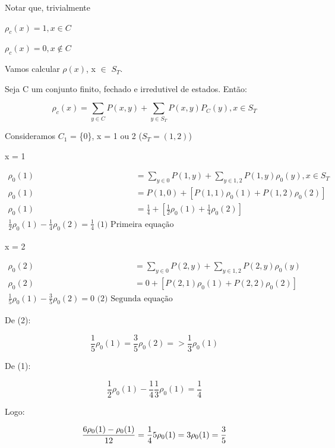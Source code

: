 \documentclass[]{article}
\theoremstyle{definition}
\theoremstyle{definition}
\theoremstyle{definition}
\theoremstyle{remark}
\let\BeginKnitrBlock\begin \let\EndKnitrBlock\end
\begin{document}
Notar que, trivialmente

\(\rho_c(x) = 1, x \in C\)

\(\rho_c(x) =0, x \notin C\)

Vamos calcular \(\rho(x)\), x \(\in\) \(S_T\).

\BeginKnitrBlock{theorem}
\protect\hypertarget{thm:unnamed-chunk-45}{}{\label{thm:unnamed-chunk-45}
}Seja C um conjunto finito, fechado e irredutivel de estados. Então:

\[\rho_c(x) = \sum_{y \in C}P(x,y) + \sum_{y \in S_T} P(x,y)P_C(y), x
\in S_T\]
\EndKnitrBlock{theorem}

Consideramos \(C_1\) = \{0\}, x = 1 ou 2 (\(S_T = (1,2)\))

x = 1

\begin{equation}
\begin{split}
\rho_{{0}}(1) &= \sum_{y \in {0}}P(1,y) + \sum_{y \in
{1,2}}P(1,y)\rho_{{0}}(y), x \in S_T\\
\rho_{{0}}(1) &= P(1,0) + [P(1,1) \rho_{{0}}(1) + P(1,2) \rho_{{0}}(2)]\\
\rho_{{0}}(1) &= \frac{1}{4} + [\frac{1}{2} \rho_{{0}}(1) + \frac{1}{4}
\rho_{{0}}(2)]\\
\frac{1}{2} \rho_{{0}}(1) - \frac{1}{4}\rho_{{0}}(2) = \frac{1}{4} \text{ (1)
Primeira equação}
\end{split}
\end{equation}

x = 2

\begin{equation}
\begin{split}
\rho_{{0}}(2) &= \sum_{y \in {0}} P(2,y) + \sum_{y \in
{1,2}}P(2,y)\rho_{{0}}(y)\\
\rho_{{0}}(2) &= 0 + [P(2,1)\rho_{{0}}(1) + P(2,2)\rho_{{0}}(2)]\\
\frac{1}{5}\rho_{{0}}(1) - \frac{3}{5} \rho_{{0}}(2) = 0 \text{ (2)
Segunda equação}
\end{split}
\end{equation}

De (2):

\[\frac{1}{5}\rho_{{0}}(1) = \frac{3}{5}\rho_{{0}}(2) =>
\frac{1}{3}\rho_{{0}}(1)\]

De (1):

\[\frac{1}{2}\rho_{{0}}(1) - \frac{1}{4} \frac{1}{3}\rho_{{0}}(1) =
\frac{1}{4}\]

Logo:

\begin{equation}
\frac{6 \rho_{{0}}(1) - \rho_{{0}}(1)}{12} = \frac{1}{4}\\
5 \rho_{{0}}(1) = 3\\
\rho_{{0}}(1) = \frac{3}{5}
\end{equation}
\end{document}

